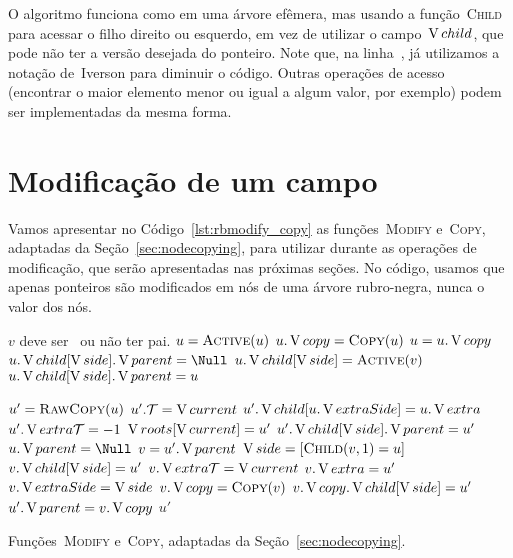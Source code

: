 \documentclass[main.tex]{subfiles}
\begin{document}
O algoritmo funciona como em uma árvore efêmera, mas usando a função~\textsc{Child} para acessar o filho direito ou esquerdo, em vez de utilizar o campo~$\operatorname{V}{child}$, que pode não ter a versão desejada do ponteiro. Note que, na linha~, já utilizamos a notação de~Iverson para diminuir o código. Outras operações de acesso (encontrar o maior elemento menor ou igual a algum valor, por exemplo) podem ser implementadas da mesma forma.

\section{Modificação de um campo}

Vamos apresentar no Código~\ref{lst:rbmodify_copy} as funções~\textsc{Modify} e~\textsc{Copy}, adaptadas da Seção~\ref{sec:nodecopying}, para utilizar durante as operações de modificação, que serão apresentadas nas próximas seções. No código, usamos que apenas ponteiros são modificados em nós de uma árvore rubro-negra, nunca o valor dos nós.

\begin{algorithm}
\begin{algorithmic}[1]

\Require $v$ deve ser~ ou não ter pai.
 
	\State $u = \Call{Active}{u}$
		\State $u.\cp = \Call{Copy}{u}$
		\State $u = u.\operatorname{V}{copy}$
	\EndIf
		\State $u.\child[\side].\parent = \Null$
	\EndIf
	\State $u.\child[\side] = \Call{Active}{v}$
		\State $u.\operatorname{V}{child}[\operatorname{V}{side}].\operatorname{V}{parent} = u$
	\EndIf
\EndFunction

	\State $u' = \Call{RawCopy}{u}$
	\State $u'.\mathcal{T} = \operatorname{V}{current}$
		\State $u'.\operatorname{V}{child}[u.\operatorname{V}{extraSide}] = u.\operatorname{V}{extra}$
		\State $u'.\operatorname{V}{extra\mathcal{T}} = -1$ 
	\EndIf
		\State $\operatorname{V}{roots}[\operatorname{V}{current}] = u'$
	\EndIf
			\State $u'.\operatorname{V}{child}[\operatorname{V}{side}].\operatorname{V}{parent} = u'$
		\EndIf
	\EndFor
	\State $u.\parent = \Null$
		\State $v = u'.\operatorname{V}{parent}$
		\State $\side = [\Call{Child}{v, 1} = u]$ \label{line:copyrb:side}
			\State $v.\operatorname{V}{child}[\operatorname{V}{side}] = u'$
			\State $v.\operatorname{V}{extra\mathcal{T}} = \operatorname{V}{current}$
			\State $v.\operatorname{V}{extra} = u'$
			\State $v.\operatorname{V}{extraSide} = \operatorname{V}{side}$
		\Else
			\State $v.\cp = \Call{Copy}{v}$
			\State $v.\operatorname{V}{copy}.\operatorname{V}{child}[\operatorname{V}{side}] = u'$
			\State $u'.\operatorname{V}{parent} = v.\operatorname{V}{copy}$
		\EndIf
	\EndIf
	\State \Return $u'$
\EndFunction

\end{algorithmic}
\caption{Funções~\textsc{Modify} e~\textsc{Copy}, adaptadas da Seção~\ref{sec:nodecopying}.} \label{lst:rbmodify_copy}
\end{algorithm}
\end{document}

